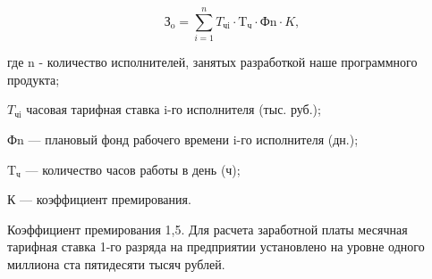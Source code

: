\begin{displaymath}
  \text{З}_{\text{o}} = \sum\limits_{i=1}^n T_{\text{чi}} \cdot \text{T}_{\text{ч}} \cdot \text{Ф}{\text{n}} \cdot K,
\end{displaymath}

где n - количество исполнителей, занятых разработкой наше программного продукта;      

\( T_{\text{чi}} \) часовая тарифная ставка i-го исполнителя (тыс. руб.);

\( \text{Ф}{\text{n}} \) --- плановый фонд рабочего времени i-го исполнителя (дн.);

\( \text{T}_{\text{ч}} \) --- количество часов работы в день (ч);

К --- коэффициент премирования.

Коэффициент премирования 1,5. Для расчета заработной платы месячная тарифная ставка 1-го разряда на предприятии установлено на уровне одного миллиона ста пятидесяти тысяч рублей.


